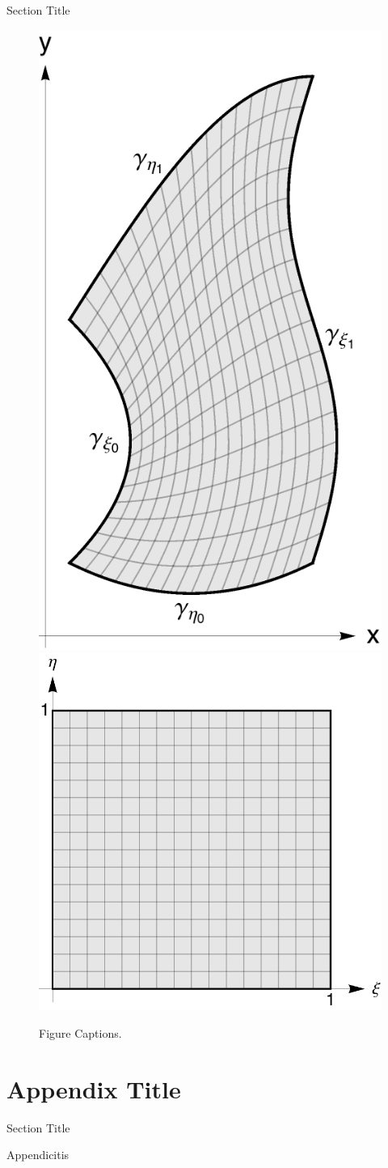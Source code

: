 \documentclass[oneside,12pt,final]{sty/ucthesis-CA2012}
\begin{document}
\begin{mainmatter}
\begin{section}{Section Title}
  \begin{figure}[t]
  \centerline{\includegraphics[width=.35\textwidth]{fig/testfig1.pdf}
  \hspace{1cm}\includegraphics[width=.45\textwidth]{fig/testfig2.pdf}}
  \caption{Figure Captions.}
  \label{fig:label}
  \end{figure}
  
  \end{section}

\appendix

\dsp

\chapter{Appendix Title }{\label{appendix:a}}
\begin{section}{Section Title}

Appendicitis

\end{section}

\ssp

%


\end{mainmatter}
\end{document}
